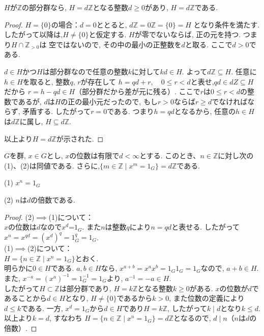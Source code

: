 \begin{tcolorbox}
  \begin{prp*}
    $H$が$\mathbb{Z}$の部分群なら, $H=d\mathbb{Z}$となる整数$d\geq0$があり,
	$H=d\mathbb{Z}$である.
  \end{prp*}
\end{tcolorbox}
\begin{proof}
  $H=\{0\}$の場合：$d=0$ととると, $d\mathbb{Z}=0\mathbb{Z}=\{0\}=H$
  となり条件を満たす. したがって以降は,$H\neq \{0\}$と仮定する.
  $H$が零でないならば, 正の元を持つ. つまり$H \cap \mathbb{Z}_{>0}$は
  空ではないので, その中の最小の正整数を$d$と取る. ここで$d>0$である.
  
  $d\in H$かつ$H$は部分群なので任意の整数$k$に対して$kd \in H$.
  よって$d\mathbb{Z} \subseteq  H$.
  任意に$h \in H$を取ると, 整数$q$, $r$が存在して
  $h = qd + r, \quad 0\leq r < d$と表せ,$ qd \in dZ \subseteq H$だから
  $r = h - qd \in H$（部分群だから差が元に残る）.
  ここで$r$は$0 \leq r < d$の整数であるが, $d$は$H$の正の最小元だったので,
  もし$r>0$ならば$r \geq d$でなければならず, 矛盾する. したがって$r=0$である.
  つまり$h=qd$となるから, 任意の$h \in H$は$d\mathbb{Z}$に属し,
  $H \subseteq d\mathbb{Z}$.
  
  以上より$H=d\mathbb{Z}$が示された.
\end{proof}\leavevmode

\begin{tcolorbox}
	\begin{prp*}
		$G$を群, $x \in G$とし, $x$の位数は有限で$d < \infty$とする.
		このとき、$n \in \mathbb{Z}$に対し次の(1)、(2)は同値である.
		さらに,$\{ m \in \mathbb{Z} \mid x^m = 1_G \} = d\mathbb{Z}$である.

		(1) $ x^n = 1_G $

		(2) $n$は$d$の倍数である.
	\end{prp*}	
\end{tcolorbox}

\begin{proof}
	(2)$\implies$(1)について：\\
	$x$の位数は$d$なので$x^d$=$1_G$. また$n$は整数$q$により$n=qd$と表せる.
	したがって$x^n = x^{qd} = (x^d)^q = 1_G^q = 1_G$.\\
	(1)$\implies$(2)について：\\
	$H=\{n \in \mathbb{Z} \mid x^n = 1_G\}$とおく.\\
	明らかに$0 \in H$である.
	$a,b \in H$なら, $x^{a+b} = x^a x^b = 1_G 1_G = 1_G$なので,
	$a+b \in H$.\\
	また, $x^{-a}=(x^a)^{-1}=1_G^{-1}=1_G$より, $a^{-1}=-a \in H$.\\
	したがって$H \subset \mathbb{Z}$は部分群であり, 
	$H=k\mathbb{Z}$となる整数$k\geq 0$がある.
	$x$の位数が$d$であることから$d \in H$となり,
	$H \neq \{0\}$であるから$k> 0$, また位数の定義により$d\leq k$である.
	一方, $x^d = 1_G$から$d \in H$であり$H=k\mathbb{Z}$,
	したがって$k \mid d$となり$k \leq d$.\\
	以上より$k=d$, すなわち
	$H=\{ n \in \mathbb{Z} \mid x^n = 1_G \} = d\mathbb{Z}$となるので,
	$d \mid n $（$n$は$d$の倍数）.
\end{proof}\leavevmode

